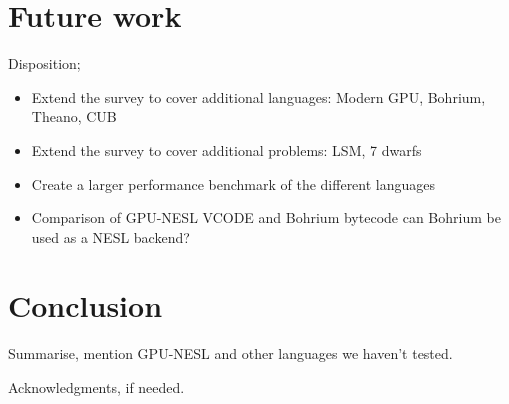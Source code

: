 \documentclass[preprint]{sigplanconf}
\begin{document}
\section{Future work}
Disposition;
\begin{itemize}
\item Extend the survey to cover additional languages:
  Modern GPU, Bohrium, Theano, CUB
\item Extend the survey to cover additional problems:
  LSM, 7 dwarfs
\item Create a larger performance benchmark of the different
  languages
\item Comparison of GPU-NESL VCODE and Bohrium bytecode
can Bohrium be used as a NESL backend?
\end{itemize}

\section{Conclusion}
Summarise, mention GPU-NESL and other languages we haven't tested.

\acks

Acknowledgments, if needed.




\end{document}
